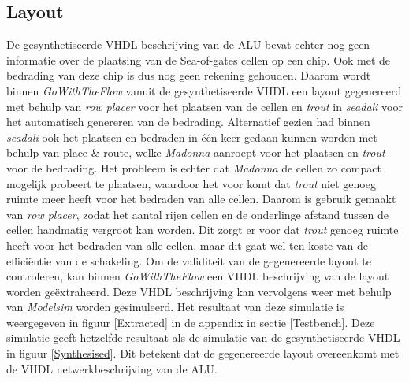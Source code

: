 \documentclass[11pt,twoside,a4paper]{article}
\begin{document}
\subsection{Layout}
De gesynthetiseerde VHDL beschrijving van de ALU bevat echter nog geen informatie over de plaatsing van de Sea-of-gates cellen op een chip. Ook met de bedrading van deze chip is dus nog geen rekening gehouden. Daarom wordt binnen \emph{GoWithTheFlow} vanuit de gesynthetiseerde VHDL een layout gegenereerd met behulp van \emph{row placer} voor het plaatsen van de cellen en \emph{trout} in \emph{seadali} voor het automatisch genereren van de bedrading. Alternatief gezien had binnen \emph{seadali} ook het plaatsen en bedraden in \'e\'en keer gedaan kunnen worden met behulp van place \& route, welke \emph{Madonna} aanroept voor het plaatsen en \emph{trout} voor de bedrading. Het probleem is echter dat \emph{Madonna} de cellen zo compact mogelijk probeert te plaatsen, waardoor het voor komt dat \emph{trout} niet genoeg ruimte meer heeft voor het bedraden van alle cellen. Daarom is gebruik gemaakt van \emph{row placer}, zodat het aantal rijen cellen en de onderlinge afstand tussen de cellen handmatig vergroot kan worden. Dit zorgt er voor dat \emph{trout} genoeg ruimte heeft voor het bedraden van alle cellen, maar dit gaat wel ten koste van de efficiëntie van de schakeling. Om de validiteit van de gegenereerde layout te controleren, kan binnen \emph{GoWithTheFlow} een VHDL beschrijving van de layout worden ge\"extraheerd. Deze VHDL beschrijving kan vervolgens weer met behulp van \emph{Modelsim} worden gesimuleerd. Het resultaat van deze simulatie is weergegeven in figuur \ref{Extracted} in de appendix in sectie \ref{Testbench}. Deze simulatie geeft hetzelfde resultaat als de simulatie van de gesynthetiseerde VHDL in figuur \ref{Synthesised}. Dit betekent dat de gegenereerde layout overeenkomt met de VHDL netwerkbeschrijving van de ALU.

\newpage
\end{document}
